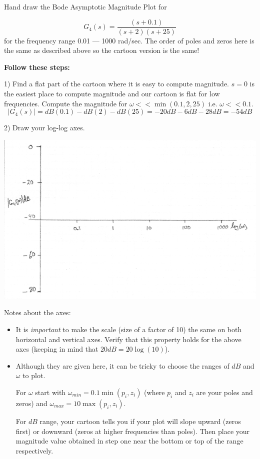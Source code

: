 \begin{Example}\label{firstBodeMagexample}
Hand draw the Bode Asymptotic Magnitude Plot for

\[
G_4(s) = \frac  {(s+0.1)}  {(s+2)(s+25)}
\]
for the frequency range 0.01 --- 1000 rad/sec.  The order of poles and zeros here
is the same as described above so the cartoon version is the same!

{\bf Follow these steps:}

1) Find a flat part of the cartoon where it is easy to compute magnitude.   $s=0$ is the
easiest place to compute magnitude and our cartoon is flat for low frequencies.
Compute the magnitude for $\omega << \min(0.1, 2, 25)$ i.e. $\omega << 0.1$.
\[
|G_4(s)| = dB(0.1) - dB(2) - dB(25) = -20dB - 6dB - 28dB = -54dB
\]

2) Draw your log-log axes.

\includegraphics[width=6.5in]{figs05/00737a.png}

Notes about the axes:
\begin{itemize}
  \item It is {\it important } to make the scale (size of a factor of 10)
  the same on both horizontal and vertical axes.
  Verify that this property holds for the above axes (keeping in mind that $20dB = 20\log(10)$).

  \item Although they are given here, it can be tricky to choose the ranges of $dB$ and $\omega$ to plot.

  For $\omega$ start with $\omega_{min} = 0.1 \min(p_i, z_i)$ (where $p_i$ and $z_i$ are your poles and zeros) and $\omega_{max} = 10 \max(p_i,z_i)$.

  For $dB$ range, your cartoon tells you if your plot will slope upward (zeros first) or downward (zeros at higher frequencies than poles).  Then place your magnitude value obtained in step one near the bottom or top of the range respectively.
\end{itemize}


\end{Example}



